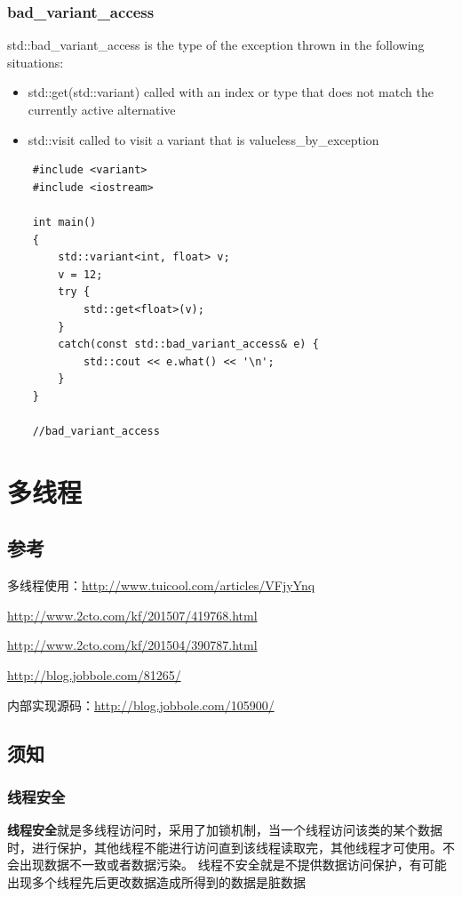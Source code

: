 \documentclass[UTF8,a4paper,12pt]{ctexbook}
\begin{document}
		\subsection{bad\_variant\_access}
			std::bad\_variant\_access is the type of the exception thrown in the following situations: 
			\begin{itemize}
				\item std::get(std::variant) called with an index or type that does not match the currently active alternative 
				\item  std::visit called to visit a variant that is valueless\_by\_exception 
			\end{itemize}
\begin{lstlisting}
	#include <variant>
	#include <iostream>
	
	int main()
	{
		std::variant<int, float> v;
		v = 12;
		try {
			std::get<float>(v);
		}
		catch(const std::bad_variant_access& e) {
			std::cout << e.what() << '\n';
		}
	}
	
	//bad_variant_access
\end{lstlisting}


\chapter{多线程}
\section{参考}
	多线程使用：\url{http://www.tuicool.com/articles/VFjyYnq}
		
		\url{http://www.2cto.com/kf/201507/419768.html}
		
		\url{http://www.2cto.com/kf/201504/390787.html}
		
		\url{http://blog.jobbole.com/81265/}
	
	内部实现源码：\url{http://blog.jobbole.com/105900/}
	
\section{须知}
	\subsection{线程安全}
		\textbf{线程安全}就是多线程访问时，采用了加锁机制，当一个线程访问该类的某个数据时，进行保护，其他线程不能进行访问直到该线程读取完，其他线程才可使用。不会出现数据不一致或者数据污染。 线程不安全就是不提供数据访问保护，有可能出现多个线程先后更改数据造成所得到的数据是脏数据
		
\end{document}
